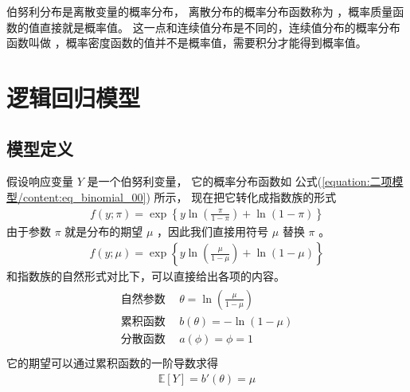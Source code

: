 \documentclass[letterpaper,10pt,english]{sphinxmanual}
\begin{document}
伯努利分布是离散变量的概率分布，
离散分布的概率分布函数称为 
，概率质量函数的值直接就是概率值。
这一点和连续值分布是不同的，连续值分布的概率分布函数叫做 
，概率密度函数的值并不是概率值，需要积分才能得到概率值。


\section{逻辑回归模型}
\label{\detokenize{_u4e8c_u9879_u6a21_u578b/content:id3}}

\subsection{模型定义}
\label{\detokenize{_u4e8c_u9879_u6a21_u578b/content:id4}}
假设响应变量 \(Y\) 是一个伯努利变量，
它的概率分布函数如 公式(\ref{equation:二项模型/content:eq_binomial_00}) 所示，
现在把它转化成指数族的形式
\begin{equation}\label{equation:二项模型/content:二项模型/content:2}
\begin{split}f(y;\pi) = \exp \left \{  y \ln \left ( \frac{\pi}{1-\pi} \right )  + \ln(1-\pi)  \right \}\end{split}
\end{equation}
由于参数 \(\pi\) 就是分布的期望 \(\mu\)
，因此我们直接用符号 \(\mu\) 替换 \(\pi\)
。
\begin{equation}\label{equation:二项模型/content:二项模型/content:3}
\begin{split}f(y;\mu) = \exp \left \{  y \ln \left ( \frac{\mu}{1-\mu} \right )  + \ln(1-\mu)  \right \}\end{split}
\end{equation}
和指数族的自然形式对比下，可以直接给出各项的内容。
\begin{align}\label{equation:二项模型/content:二项模型/content:4}\!\begin{aligned}
\text{自然参数}\ &\ \theta = \ln \left ( \frac{\mu}{1-\mu} \right )\\
\text{累积函数}\ &\ b(\theta) = - \ln(1-\mu)\\
\text{分散函数}\ &\ a(\phi) = \phi = 1\\
\end{aligned}\end{align}
它的期望可以通过累积函数的一阶导数求得
\begin{equation}\label{equation:二项模型/content:二项模型/content:5}
\begin{split}\mathbb{E}[Y] = b'(\theta)= \mu\end{split}
\end{equation}
\end{document}
